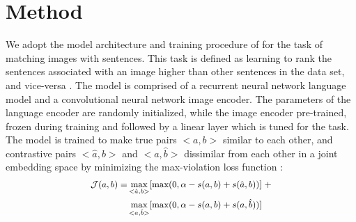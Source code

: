 \section{Method}


We adopt the model architecture and training procedure
of \cite{kadar2018conll} for the task of matching images with sentences. This task is defined as learning to rank the sentences associated with an image higher than other sentences in the data set, and vice-versa \citep{hodosh2013framing}. The model is comprised of 
a recurrent neural network language model and a 
convolutional neural network image encoder. 
The parameters of the 
language encoder are randomly initialized, while
the image encoder pre-trained, frozen during 
training and followed by a linear layer which is
tuned for the task.  
The model is trained to make true pairs $<a,b>$ 
similar to each other, and contrastive pairs
$<\hat{a},b>$ and 
$<a,\hat{b}>$ dissimilar from each other in a joint
embedding space by minimizing the max-violation loss function
\citep{faghri2017vse++}:
%
\begin{equation}
\small{
\label{eq:maxviol}
\begin{split}
\mathcal{J}(a, b) = &\max_{<\hat{a}, b>}[\text{max}(0, \alpha - s(a,b) + s(\hat{a}, b))] \;+ \\ &\max_{<a, \hat{b}>}[\text{max}(0, \alpha - s(a,b) + s(a, \hat{b}))]
\end{split}
}
\end{equation}

